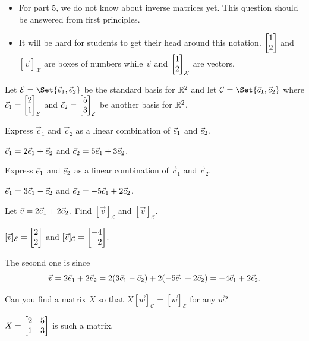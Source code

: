 \documentclass{workbook}
\begin{document}
\begin{slide}
\begin{annotation}
\begin{notes}
\begin{itemize}
					We will be sloppy again in the future---if we interpret $\mat{1\\2}$
					as a vector, we will always assume it is $\mat{1\\2}_{\mathcal E}$ unless
					specified otherwise. But, at the start of change-of-basis, we will be careful.
				\item For part 5, we do not know about inverse matrices yet. This question should
					be answered from first principles.
				\item It will be hard for students to get their head around this notation. $\mat{1\\2}$ and $[\vec v]_{\mathcal X}$
					are boxes of numbers while $\vec v$ and $\mat{1\\2}_{\mathcal X}$ are vectors.
			\end{itemize}
		\end{notes}
	\end{annotation}
	Let $\mathcal E=\Set{\xhat,\yhat}$ be the standard basis for $\mathbb{R}^2$ and
	let $\mathcal C=\Set{\vec c_1,\vec c_2}$ where $\vec c_1=\mat{2\\1}_{\mathcal E}$
	and $\vec c_2=\mat{5\\3}_{\mathcal E}$ be another basis for $\mathbb{R}^2$.
	\begin{parts}
		\item Express $\vec c_1$ and $\vec c_2$ as a linear combination of ${\vec e_1}$ and ${\vec e_2}$.
			\begin{solution}[inline]
				$\vec c_1=2{\vec e_1}+{\vec e_2}$ and $\vec c_2=5{\vec e_1}+3{\vec e_2}$.
			\end{solution}
		\item Express ${\vec e_1}$ and ${\vec e_2}$ as a linear combination of $\vec c_1$ and $\vec c_2$.
			\begin{solution}[inline]
				${\vec e_1}=3\vec c_1-\vec c_2$ and ${\vec e_2}=-5\vec c_1+2\vec c_2$.
			\end{solution}
		\item Let $\vec v=2{\vec e_1}+2{\vec e_2}$. Find $[\vec v]_{\mathcal E}$ and $[\vec v]_{\mathcal C}$.
			\begin{solution}
				$[\vec v]_{\mathcal E} = \mat{2\\2}$ and
				$[\vec v]_{\mathcal C} = \mat{-4\\2}$.

				The second one is since
				\[
					\vec v=2{\vec e_1}+2{\vec e_2}
					=2(3\vec c_1-\vec c_2)+2(-5\vec c_1+2\vec c_2)
					=-4\vec c_1+2\vec c_2.
				\]
			\end{solution}
		\item Can you find a matrix $X$ so that $X[\vec w]_{\mathcal C} = [\vec w]_{\mathcal E}$
			for any	$\vec w$?
			\begin{solution}
				$X = \mat{2&5\\1&3}$ is such a matrix.


\end{solution}
\end{parts}
\end{slide}
\end{document}
